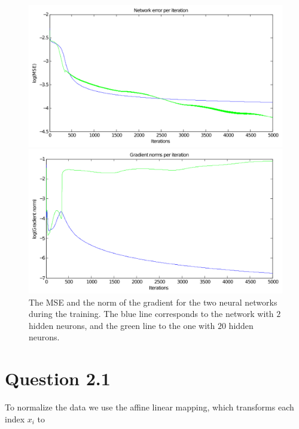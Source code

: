 \documentclass[11pt,a4paper]{article}
\begin{document}
\begin{figure}[htbp]
    \centering
    \begin{minipage}[b]{\linewidth}
        \centering
        \includegraphics[width=\textwidth]{figures/errors.pdf}
    \end{minipage}

    \begin{minipage}[b]{\linewidth}
        \centering
        \includegraphics[width=\textwidth]{figures/norms.pdf}
    \end{minipage}
    \caption{The MSE and the norm of the gradient for the two neural networks
        during the training. The blue line corresponds to the network with $2$
    hidden neurons, and the green line to the one with $20$ hidden neurons.}
    \label{fig:error_norm}
\end{figure}

\section{Question 2.1}
To normalize the data we use the affine linear mapping, which transforms each index $x_i$ to
\end{document}
